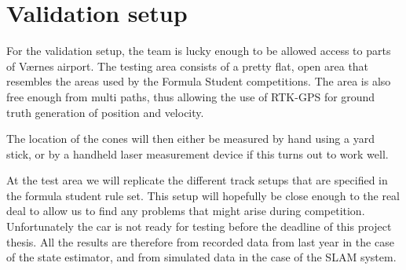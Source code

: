 \section{Validation setup}
For the validation setup, the team is lucky enough to be allowed access to parts of V\ae rnes airport. The testing area consists of a pretty flat, open area that resembles the areas used by the Formula Student competitions. The area is also free enough from multi paths, thus allowing the use of \gls{RTK-GPS} for ground truth generation of position and velocity. 

The location of the cones will then either be measured by hand using a yard stick, or by a handheld laser measurement device if this turns out to work well. 

At the test area we will replicate the different track setups that are specified in the formula student rule set. This setup will hopefully be close enough to the real deal to allow us to find any problems that might arise during competition. Unfortunately the car is not ready for testing before the deadline of this project thesis. All the results are therefore from recorded data from last year in the case of the state estimator, and from simulated data in the case of the \gls{SLAM} system. 

